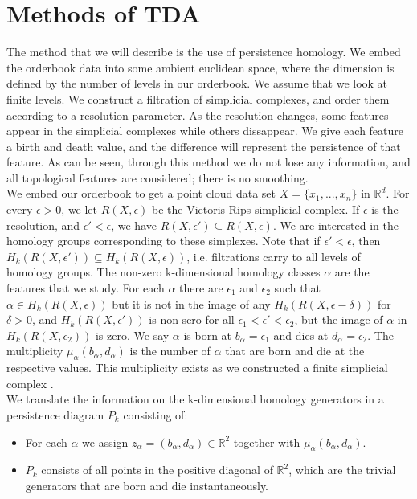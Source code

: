 \documentclass[14pt]{extarticle}
\newcommand\Reals{{\mathbb{R}}}
\newcommand{\eone}{\epsilon_1}
\newcommand{\etwo}{\epsilon_2}
\begin{document}
\part{Methods of TDA}
The method that we will describe is the use of persistence homology. We embed the orderbook data into some ambient euclidean space, where the dimension is defined by the number of levels in our orderbook. We assume that we look at finite levels. We construct a filtration of simplicial complexes, and order them according to a resolution parameter. As the resolution changes, some features appear in the simplicial complexes while others dissappear. We give each feature a birth and death value, and the difference will represent the persistence of that feature. As can be seen, through this method we do not lose any information, and all topological features are considered; there is no smoothing\cite{gidea2018topological}.\\
We embed our orderbook to get a point cloud data set $X=\{x_1,...,x_n\}$ in $\Reals^d$. For every $\epsilon>0$, we let $R(X,\epsilon)$ be the Vietoris-Rips simplicial complex. If $\epsilon$ is the resolution, and $\epsilon'<\epsilon$, we have $R(X,\epsilon')\subseteq R(X,\epsilon)$. We are interested in the homology groups corresponding to these simplexes. Note that if $\epsilon'<\epsilon$, then $H_k(R(X,\epsilon'))\subseteq H_k(R(X,\epsilon))$, i.e. filtrations carry to all levels of homology groups. The non-zero k-dimensional homology classes $\alpha$ are the features that we study. For each $\alpha$ there are $\eone$ and $\etwo$ such that $\alpha\in H_k(R(X,\epsilon))$ but it is not in the image of any $H_k(R(X,\epsilon-\delta))$ for $\delta>0$, and $H_k(R(X,\epsilon'))$ is non-sero for all $\eone<\epsilon'<\etwo$, but the image of $\alpha$ in $H_k(R(X,\etwo))$ is zero. We say $\alpha$ is born at $b_\alpha = \eone$ and dies at $d_\alpha = \etwo$. The multiplicity $\mu_\alpha(b_\alpha,d_\alpha)$ is the number of $\alpha$ that are born and die at the respective values. This multiplicity exists as we constructed a finite simplicial complex \cite{chazal2017introduction}.\\
We translate the information on the k-dimensional homology generators in a persistence diagram $P_k$ consisting of:
\begin{itemize}
\item
For each $\alpha$ we assign $z_\alpha=(b_\alpha,d_\alpha)\in\Reals^2$ together with $\mu_\alpha(b_\alpha,d_\alpha)$.
\item
$P_k$ consists of all points in the positive diagonal of $\Reals^2$, which are the trivial generators that are born and die instantaneously.
\end{itemize}
\end{document}
